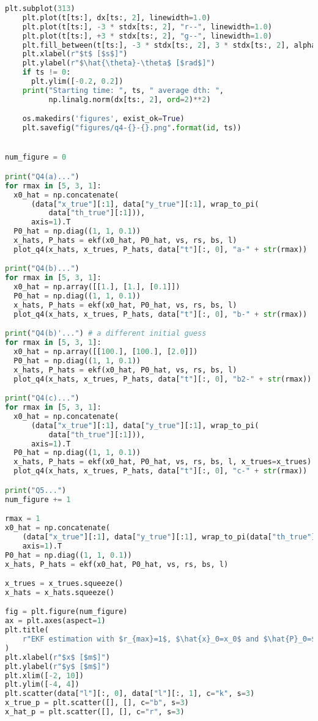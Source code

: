 \documentclass[a4paper]{article}
\begin{document}
\begin{lstlisting}[language=Python, basicstyle=\small]
    plt.subplot(313)
    plt.plot(t[ts:], dx[ts:, 2], linewidth=1.0)
    plt.plot(t[ts:], -3 * stdx[ts:, 2], "r--", linewidth=1.0)
    plt.plot(t[ts:], +3 * stdx[ts:, 2], "g--", linewidth=1.0)
    plt.fill_between(t[ts:], -3 * stdx[ts:, 2], 3 * stdx[ts:, 2], alpha=0.2)
    plt.xlabel(r"$t$ [$s$]")
    plt.ylabel(r"$\hat{\theta}-\theta$ [$rad$]")
    if ts != 0:
      plt.ylim([-0.2, 0.2])
    print("Starting time: ", ts, " average dth: ",
          np.linalg.norm(dx[ts:, 2], ord=2)**2)

    os.makedirs('figures', exist_ok=True)
    plt.savefig("figures/q4-{}-{}.png".format(id, ts))


num_figure = 0

print("Q4(a)...")
for rmax in [5, 3, 1]:
  x0_hat = np.concatenate(
      (data["x_true"][:1], data["y_true"][:1], wrap_to_pi(
          data["th_true"][:1])),
      axis=1).T
  P0_hat = np.diag((1, 1, 0.1))
  x_hats, P_hats = ekf(x0_hat, P0_hat, vs, rs, bs, l)
  plot_q4(x_hats, x_trues, P_hats, data["t"][:, 0], "a-" + str(rmax))

print("Q4(b)...")
for rmax in [5, 3, 1]:
  x0_hat = np.array([[1.], [1.], [0.1]])
  P0_hat = np.diag((1, 1, 0.1))
  x_hats, P_hats = ekf(x0_hat, P0_hat, vs, rs, bs, l)
  plot_q4(x_hats, x_trues, P_hats, data["t"][:, 0], "b-" + str(rmax))

print("Q4(b)'...") # a different initial guess
for rmax in [5, 3, 1]:
  x0_hat = np.array([[100.], [100.], [2.0]])
  P0_hat = np.diag((1, 1, 0.1))
  x_hats, P_hats = ekf(x0_hat, P0_hat, vs, rs, bs, l)
  plot_q4(x_hats, x_trues, P_hats, data["t"][:, 0], "b2-" + str(rmax))

print("Q4(c)...")
for rmax in [5, 3, 1]:
  x0_hat = np.concatenate(
      (data["x_true"][:1], data["y_true"][:1], wrap_to_pi(
          data["th_true"][:1])),
      axis=1).T
  P0_hat = np.diag((1, 1, 0.1))
  x_hats, P_hats = ekf(x0_hat, P0_hat, vs, rs, bs, l, x_trues=x_trues)
  plot_q4(x_hats, x_trues, P_hats, data["t"][:, 0], "c-" + str(rmax))

print("Q5...")
num_figure += 1

rmax = 1
x0_hat = np.concatenate(
    (data["x_true"][:1], data["y_true"][:1], wrap_to_pi(data["th_true"][:1])),
    axis=1).T
P0_hat = np.diag((1, 1, 0.1))
x_hats, P_hats = ekf(x0_hat, P0_hat, vs, rs, bs, l)

x_trues = x_trues.squeeze()
x_hats = x_hats.squeeze()

fig = plt.figure(num_figure)
ax = plt.axes(aspect=1)
plt.title(
    r"EKF estimation with $r_{max}=1$, $\hat{x}_0=x_0$ and $\hat{P}_0=$diag$\{1, 1, 0.1\}$"
)
plt.xlabel(r"$x$ [$m$]")
plt.ylabel(r"$y$ [$m$]")
plt.xlim([-2, 10])
plt.ylim([-4, 4])
plt.scatter(data["l"][:, 0], data["l"][:, 1], c="k", s=3)
x_true_p = plt.scatter([], [], c="b", s=3)
x_hat_p = plt.scatter([], [], c="r", s=3)


\end{lstlisting}
\end{document}
